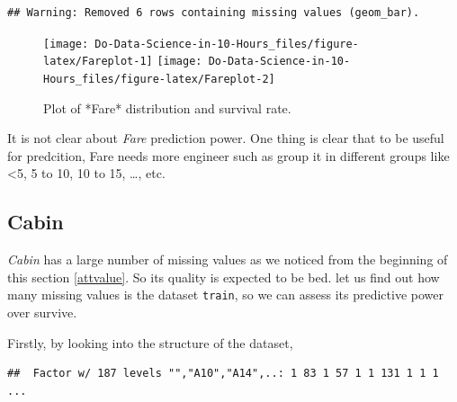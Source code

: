 \documentclass[
]{book}
\newenvironment{Shaded}{\begin{snugshade}}{\end{snugshade}}
\newcommand{\CommentTok}[1]{\textcolor[rgb]{0.56,0.35,0.01}{\textit{#1}}}
\newcommand{\DecValTok}[1]{\textcolor[rgb]{0.00,0.00,0.81}{#1}}
\newcommand{\KeywordTok}[1]{\textcolor[rgb]{0.13,0.29,0.53}{\textbf{#1}}}
\newcommand{\NormalTok}[1]{#1}
\newcommand{\OperatorTok}[1]{\textcolor[rgb]{0.81,0.36,0.00}{\textbf{#1}}}
\newcommand{\StringTok}[1]{\textcolor[rgb]{0.31,0.60,0.02}{#1}}
\begin{document}
\begin{verbatim}
## Warning: Removed 6 rows containing missing values (geom_bar).
\end{verbatim}

\begin{figure}

{\centering \texttt{[image: Do-Data-Science-in-10-Hours\_files/figure-latex/Fareplot-1]} \texttt{[image: Do-Data-Science-in-10-Hours\_files/figure-latex/Fareplot-2]} 

}

\caption{Plot of *Fare* distribution and survival rate.}\label{fig:Fareplot}
\end{figure}

It is not clear about \emph{Fare} prediction power. One thing is clear that to be useful for predcition, Fare needs more engineer such as group it in different groups like \textless5, 5 to 10, 10 to 15, \ldots, etc.

\hypertarget{cabin}{%
\subsection{Cabin}\label{cabin}}

\emph{Cabin} has a large number of missing values as we noticed from the beginning of this section \ref{attvalue}. So its quality is expected to be bed. let us find out how many missing values is the dataset \texttt{train}, so we can assess its predictive power over survive.

Firstly, by looking into the structure of the dataset,

\begin{Shaded}
\end{Shaded}

\begin{verbatim}
##  Factor w/ 187 levels "","A10","A14",..: 1 83 1 57 1 1 131 1 1 1 ...
\end{verbatim}

\begin{Shaded}
\end{Shaded}
\end{document}
